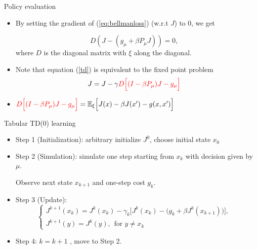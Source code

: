 \documentclass{beamer}
\def\E{{\mathbb E}}
\newcommand{\red}[1]{\textcolor{red}{#1}}
\begin{document}
\begin{frame}{Policy evaluation}
\begin{itemize}
\item By setting the gradient of (\ref{eq:bellmanloss}) (w.r.t $J$) to
  0, we get

\begin{equation}\label{td}
D(J - (g_\mu +\beta P_\mu J)) = 0,
\end{equation}
where $D$ is the diagonal matrix with $\xi$ along the diagonal.

\item Note that equation (\ref{td}) is equivalent to the fixed point problem
\begin{equation*}
J = J - \gamma \red{D\Big[(I - \beta P_\mu)J -  g_\mu\Big]}
\end{equation*}


\item  $\red{D\Big[(I - \beta P_\mu)J -  g_\mu\Big]} = \E_\xi \Big[ J(x) - \beta J(x') - g(x, x') \Big]$
\end{itemize}


\end{frame}




\begin{frame}{Tabular TD(0) learning}
\begin{itemize}
  \item Step 1 (Initialization): arbitrary initialize $J^0$, choose initial state $x_0$
  \item Step 2 (Simulation): simulate one step starting from $x_k$ with decision given by $\mu$.

Observe next state $x_{k+1}$ and one-step cost $g_k$.
  \item Step 3 (Update): \begin{equation*}
  \begin{cases}
  J^{k+1}(x_k) =  J^k(x_k) - \gamma_k \Big [ J^k(x_k) - \big(g_k + \beta J^k(x_{k+1})\big)\Big],\\
  J^{k+1}(y) = J^{k}(y),~~\text{for }y\neq x_k
  \end{cases}
  \end{equation*}
  \item Step 4: $k = k+1$ , move to Step 2.
\end{itemize}



\end{frame}
\end{document}
